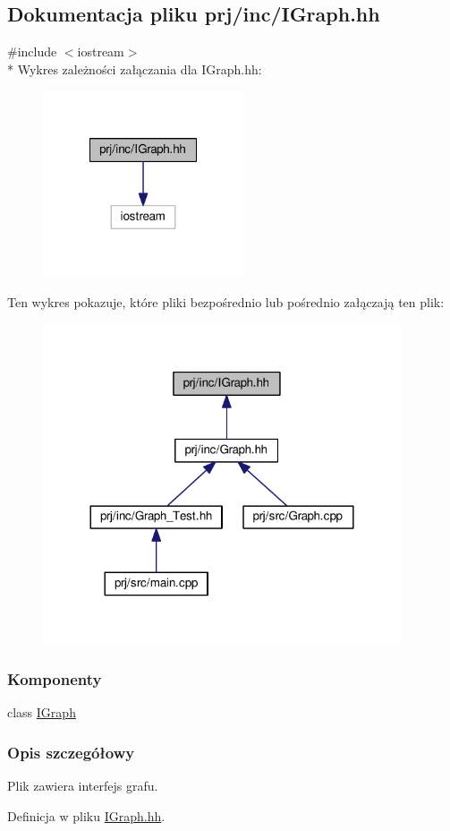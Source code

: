 \hypertarget{_i_graph_8hh}{\subsection{Dokumentacja pliku prj/inc/\-I\-Graph.hh}
\label{_i_graph_8hh}
}
{\ttfamily \#include $<$iostream$>$}\\*
Wykres zależności załączania dla I\-Graph.\-hh\-:
\nopagebreak
\begin{figure}[H]
\begin{center}
\leavevmode
\includegraphics[width=168pt]{_i_graph_8hh__incl}
\end{center}
\end{figure}
Ten wykres pokazuje, które pliki bezpośrednio lub pośrednio załączają ten plik\-:
\nopagebreak
\begin{figure}[H]
\begin{center}
\leavevmode
\includegraphics[width=300pt]{_i_graph_8hh__dep__incl}
\end{center}
\end{figure}
\subsubsection*{Komponenty}
\begin{DoxyCompactItemize}
\item 
class \hyperlink{class_i_graph}{I\-Graph}
\end{DoxyCompactItemize}


\subsubsection{Opis szczegółowy}
Plik zawiera interfejs grafu. 

Definicja w pliku \hyperlink{_i_graph_8hh_source}{I\-Graph.\-hh}.

